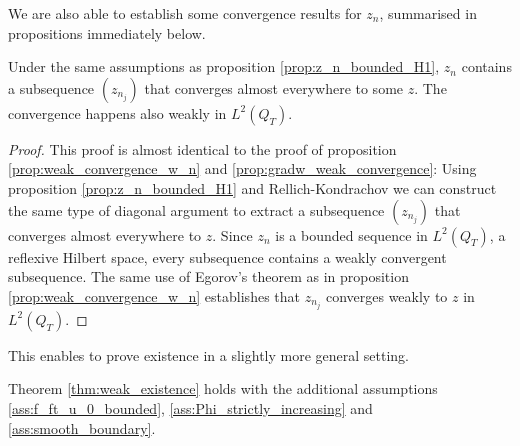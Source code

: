 \documentclass[11pt, a4paper]{article}
\begin{document}
We are also able to establish some convergence results for $z_n$, summarised in propositions immediately below.

\begin{proposition}
\label{prop:z_n_weak_convergence}
Under the same assumptions as proposition \ref{prop:z_n_bounded_H1}, $z_n$ contains a subsequence $(z_{n_j})$ that converges almost everywhere to some $z$. The convergence happens also weakly in $L^2(Q_T)$. 
\end{proposition}

\begin{proof}
This proof is almost identical to the proof of proposition \ref{prop:weak_convergence_w_n} and \ref{prop:gradw_weak_convergence}: Using proposition \ref{prop:z_n_bounded_H1} and Rellich-Kondrachov we can construct the same type of diagonal argument to extract a subsequence $(z_{n_j})$ that converges almost everywhere to $z$. Since $z_n$ is a bounded sequence in $L^2(Q_T)$, a reflexive Hilbert space, every subsequence contains a weakly convergent subsequence. The same use of Egorov's theorem as in proposition \ref{prop:weak_convergence_w_n} establishes that $z_{n_j}$ converges weakly to $z$ in $L^2(Q_T)$.
\end{proof}


This enables to prove existence in a slightly more general setting.
\begin{lemma}
\label{lem:weak_existence_part2}
Theorem \ref{thm:weak_existence} holds with the additional assumptions \ref{ass:f_ft_u_0_bounded}, \ref{ass:Phi_strictly_increasing} and \ref{ass:smooth_boundary}.
\end{lemma}
\end{document}
